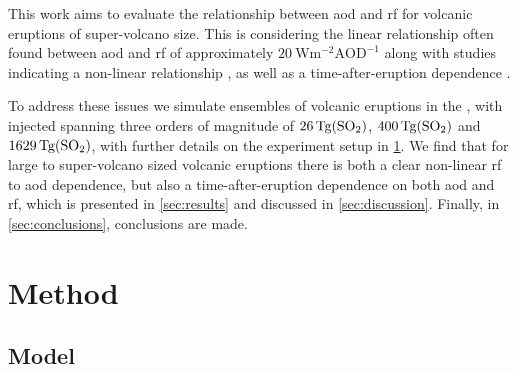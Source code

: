 \documentclass[twocol]{ametsocV6.1}
\newcommand{\iso}[1][i]{{#1}njected \ce{SO2}}
\begin{document}

This work aims to evaluate the relationship between \gls{aod} and \gls{rf} for volcanic
eruptions of super-volcano size. This is considering the linear relationship often found
between \gls{aod} and \gls{rf} of approximately
\(\SI{20}{\watt\metre^{-2}\mathrm{AOD}^{-1}}\) \citep{gregory2016, marshall2020,
  mills2017, myhre2013} along with studies indicating a non-linear relationship
\citep{niemeier2015}, as well as a time-after-eruption dependence \citep{marshall2020}.

To address these issues we simulate ensembles of volcanic eruptions in the
, with \iso{} spanning three orders of magnitude of
\(\SI{26}{\tera\gram(\ce{SO2})}\), \(\SI{400}{\tera\gram(\ce{SO2})}\) and
\(\SI{1629}{\tera\gram(\ce{SO2})}\), with further details on the experiment setup in
\ref{sec:method}. We find that for large to super-volcano sized volcanic eruptions there
is both a clear non-linear \gls{rf} to \gls{aod} dependence, but also a
time-after-eruption dependence on both \gls{aod} and \gls{rf}, which is presented in
\ref{sec:results} and discussed in \ref{sec:discussion}. Finally, in
\ref{sec:conclusions}, conclusions are made.

\section{Method}\label{sec:method}

\subsection{Model}
\end{document}

